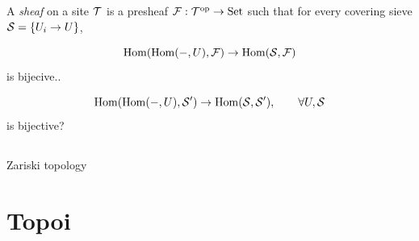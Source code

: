 \documentclass{../../large}
\begin{document}
\begin{prb}
A \emph{sheaf} on a site $\cT$ is a presheaf $\cF:\cT^\op\to\Set$ such that for every covering sieve $\cS=\{U_i\to U\}$,

\[\Hom(\Hom(-,U),\cF)\to\Hom(\cS,\cF)\]
is bijecive..


\[\Hom(\Hom(-,U),\cS')\to\Hom(\cS,\cS'),\qquad\forall U,\cS\]
is bijective?

\end{prb}



\section{}

Zariski topology



\chapter{Topoi}
\end{document}
